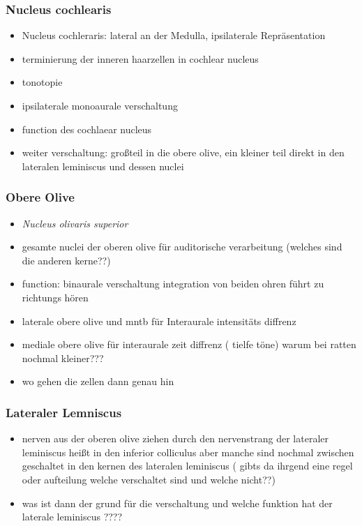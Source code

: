 \documentclass[12pt,a4paper,pdftex]{article}
\begin{document}
\subsubsection*{Nucleus cochlearis}
   
\begin{itemize}
 \item Nucleus cochleraris: lateral an der Medulla, ipsilaterale Repräsentation
    \item terminierung der inneren haarzellen in cochlear nucleus 
    \item tonotopie 
    \item ipsilaterale monoaurale verschaltung
    \item function des cochlaear nucleus
    \item weiter verschaltung: großteil in die obere olive, ein kleiner teil direkt in den lateralen leminiscus und dessen nuclei 
\end{itemize}


\subsubsection*{Obere Olive}
\begin{itemize}
    \item \textit{Nucleus olivaris superior}
    \item gesamte nuclei der oberen olive für auditorische verarbeitung (welches sind die anderen kerne??)
    \item function: binaurale verschaltung integration von beiden ohren führt zu richtungs hören
    \item laterale obere olive und mntb für Interaurale intensitäts diffrenz
    \item mediale obere olive für interaurale zeit diffrenz ( tielfe töne) warum bei ratten nochmal kleiner???
    \item wo gehen die zellen dann genau hin
\end{itemize}


\subsubsection*{Lateraler Lemniscus}
    \begin{itemize}
        \item nerven aus der oberen olive ziehen durch den nervenstrang der lateraler leminiscus heißt in den inferior colliculus aber manche sind nochmal zwischen geschaltet in den kernen des lateralen leminiscus ( gibts da ihrgend eine regel oder aufteilung welche verschaltet sind und welche nicht??)
        \item was ist dann der grund für die verschaltung und welche funktion hat der laterale leminiscus ????
    \end{itemize}
\end{document}
